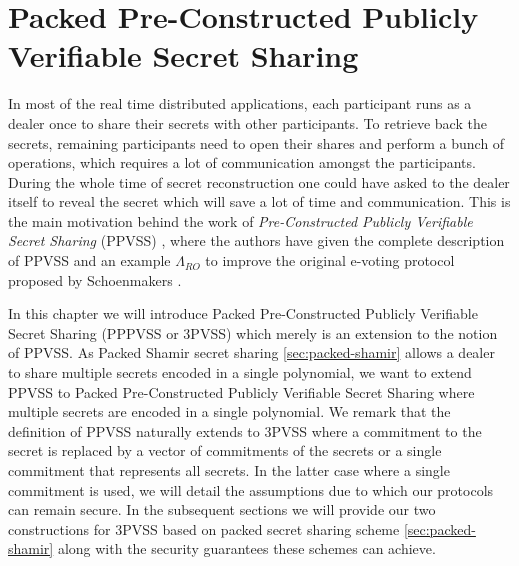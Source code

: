\chapter{Packed Pre-Constructed Publicly Verifiable Secret Sharing}
\label{cha:3}
In most of the real time distributed applications, each participant runs as a dealer once to share their 
secrets with other participants. To retrieve back the secrets, remaining participants need to open their 
shares and perform a bunch of operations, which requires a lot of communication 
amongst the participants. During the whole time of secret reconstruction one could have asked to the dealer 
itself to reveal the secret which will save a lot of time and communication. This is the main motivation 
behind the work of \textit{Pre-Constructed Publicly Verifiable Secret Sharing} (PPVSS) \cite{cryptoeprint:2025/576}, 
where the authors have given the complete description of PPVSS and an example $\Lambda_{RO}$ to improve 
the original e-voting protocol proposed by Schoenmakers \cite{5581ccd9530540479539d21d1d39ae96}.\par

In this chapter we will introduce Packed Pre-Constructed Publicly Verifiable Secret Sharing (PPPVSS or 3PVSS) which merely 
is an extension to the notion of PPVSS. As Packed Shamir secret sharing \ref{sec:packed-shamir} allows a 
dealer to share multiple secrets encoded in a single polynomial, we want to extend PPVSS to Packed 
Pre-Constructed Publicly Verifiable Secret Sharing where 
multiple secrets are encoded in a single polynomial. We remark that 
the definition of PPVSS naturally extends to 3PVSS where a commitment to the secret is replaced 
by a vector of commitments of the secrets or a single commitment that represents all secrets. In the latter case 
where a single commitment is used, we will detail the assumptions due to which our protocols 
can remain secure. In the 
subsequent sections we will provide our two constructions for 3PVSS based on packed secret sharing 
scheme \ref{sec:packed-shamir} along with the security guarantees these schemes can achieve.\par



